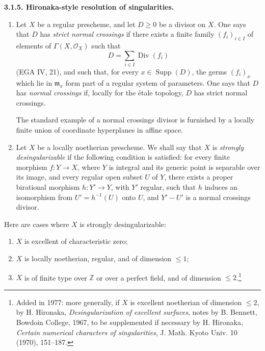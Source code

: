 \documentclass[11pt]{article}
\DeclareMathOperator{\Supp}{Supp}
\DeclareMathOperator{\Div}{Div}
\providecommand{\cO}{\mathcal{O}}
\providecommand{\fm}{\mathfrak{m}}
\providecommand{\ZZ}{\mathbb{Z}}
\newenvironment{statement}[1]{\par\medskip\noindent\textbf{#1.}\ }{\par\medskip}
\providecommand{\Supp}{\operatorname{Supp}}
\providecommand{\fm}{\mathfrak m}
\begin{document}
\label{sga5:I:statement:3.1.5}\begin{statement}{3.1.5. Hironaka-style resolution of singularities}
\begin{enumerate}[label=\alph*)]
\item Let $X$ be a regular prescheme, and let $D\ge0$ be a divisor on $X$. One says that $D$ has \emph{strict normal crossings} if there exists a finite family $(f_i)_{i\in I}$ of elements of $\Gamma(X,\cO_X)$ such that
\[
   D=\sum_{i\in I}\Div(f_i)
\]
(EGA IV, 21), and such that, for every $x\in\Supp(D)$, the germs $(f_i)_x$ which lie in $\fm_x$ form part of a regular system of parameters. One says that $D$ has \emph{normal crossings} if, locally for the étale topology, $D$ has strict normal crossings.

The standard example of a normal crossings divisor is furnished by a locally finite union of coordinate hyperplanes in affine space.

\item Let $X$ be a locally noetherian prescheme. We shall say that $X$ is \emph{strongly desingularizable} if the following condition is satisfied: for every finite morphism $f:Y\to X$, where $Y$ is integral and its generic point is separable over its image, and every regular open subset $U$ of $Y$, there exists a proper birational morphism $h:Y'\to Y$, with $Y'$ regular, such that $h$ induces an isomorphism from $U'=h^{-1}(U)$ onto $U$, and $Y'-U'$ is a normal crossings divisor.
\end{enumerate}
Here are cases where $X$ is strongly desingularizable:
\begin{enumerate}[label=\alph*)]
\item $X$ is excellent of characteristic zero;
\item $X$ is locally noetherian, regular, and of dimension $\le1$;
\item $X$ is of finite type over $\ZZ$ or over a perfect field, and of dimension $\le2$.\footnote{Added in 1977: more generally, if $X$ is excellent noetherian of dimension $\le2$, by H. Hironaka, \emph{Desingularization of excellent surfaces}, notes by B. Bennett, Bowdoin College, 1967, to be supplemented if necessary by H. Hironaka, \emph{Certain numerical characters of singularities}, J. Math. Kyoto Univ. 10 (1970), 151--187.}
\end{enumerate}
\end{statement}
\end{document}
